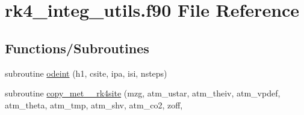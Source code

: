 \hypertarget{rk4__integ__utils_8f90}{}\section{rk4\+\_\+integ\+\_\+utils.\+f90 File Reference}
\label{rk4__integ__utils_8f90}
\subsection*{Functions/\+Subroutines}
\begin{DoxyCompactItemize}
\item 
subroutine \hyperlink{rk4__integ__utils_8f90_a313e8e2de84e6d5ebc4d9a9024066db1}{odeint} (h1, csite, ipa, isi, nsteps)
\item 
subroutine \hyperlink{rk4__integ__utils_8f90_a1c1388f3894670e417eb8e6f30414ec1}{copy\+\_\+met\+\_\+\_\+rk4site} (mzg,                                                                                                                                                                                                                                                                                               atm\+\_\+ustar,                                                                                                                                                                                                                                                                       atm\+\_\+theiv,                                                                                                                                                                                                                                                                       atm\+\_\+vpdef,                                                                                                                                                                                                                                                                       atm\+\_\+theta,                                                                                                                                                                                                                                                                       atm\+\_\+tmp,                                                                                                                                                                                                                                                                               atm\+\_\+shv,                                                                                                                                                                                                                                                                               atm\+\_\+co2,                                                                                                                                                                                                                                                                               zoff,                                                                                                          
\end{DoxyCompactItemize}

